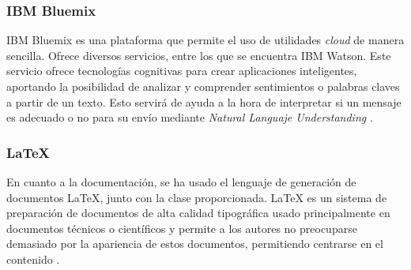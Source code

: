 \subsubsection*{IBM Bluemix}
IBM Bluemix es una plataforma que permite el uso de utilidades \textit{cloud} de manera sencilla. Ofrece diversos servicios, entre los que se encuentra IBM Watson. Este servicio ofrece tecnologías cognitivas para crear aplicaciones inteligentes, aportando la posibilidad de analizar y comprender sentimientos o palabras claves a partir de un texto. Esto servirá de ayuda a la hora de interpretar si un mensaje es adecuado o no para su envío mediante \textit{Natural Languaje Understanding} \cite{IBM}.

\subsubsection*{LaTeX}
En cuanto a la documentación, se ha usado el lenguaje de generación de documentos \LaTeX{}, junto con la clase \esitfg{} proporcionada. \LaTeX{} es un sistema de preparación de documentos de alta calidad tipográfica usado principalmente en documentos técnicos o científicos y permite a los autores no preocuparse demasiado por la apariencia de estos documentos, permitiendo centrarse en el contenido \cite{TheLatexProject}.

